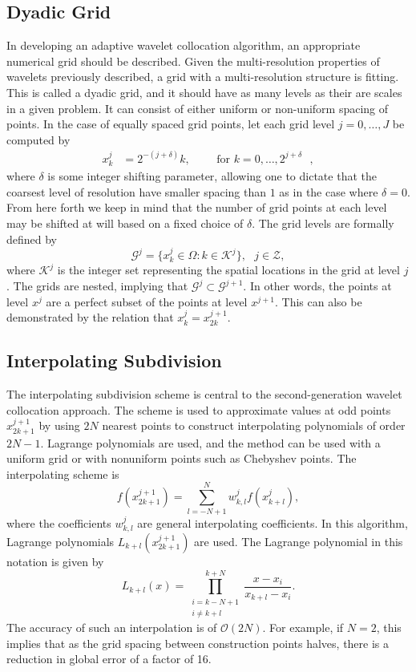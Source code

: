 \documentclass[11pt]{article}
\begin{document}
\subsection{Dyadic Grid}
In developing an adaptive wavelet collocation algorithm, an appropriate numerical grid should be described. Given the 
multi-resolution properties of wavelets previously described, a grid with a multi-resolution structure is fitting. This 
is called a dyadic grid, and it should have as many levels as their are scales in a given problem. It can consist of 
either uniform or non-uniform
spacing of points. In the case of equally spaced grid points, let each grid level $j = 0, \dots, J$ be computed by 
\begin{align}
x^{j}_{k} &= 2^{-(j+\delta)} k,\text{ } \text{ } \text{ }  \text{ for $k=0,\dots,2^{j+\delta}$ },
\end{align}
where $\delta$ is some integer shifting parameter, allowing one to dictate that the coarsest level of resolution have 
smaller spacing than $1$ as in the case where $\delta=0$. From here forth we keep in mind that the 
number of grid points at each level may be shifted at will based on a fixed choice of $\delta$. 
The grid levels are formally defined by 
\begin{equation}
    \mathcal{G}^j= \{ x_{k}^{j} \in \Omega : k \in \mathcal{K}^j \}, \text{ } j \in \mathcal{Z},
\end{equation}
where $\mathcal{K}^{j}$ is the integer set representing the spatial locations in the grid at level $j$. The grids are 
nested, implying that $\mathcal{G}^{j} \subset \mathcal{G}^{j+1}$. In other words, the points at level $x^{j}$ are a perfect 
subset of the points at level $x^{j+1}$. This can also be demonstrated by the relation that 
$x_{k}^{j}=x_{2k}^{j+1}$.

\subsection{Interpolating Subdivision}
The interpolating subdivision scheme is central to the second-generation wavelet collocation approach. The scheme is used to
approximate values at odd points $x_{2k+1}^{j+1}$ by using $2N$ nearest points to construct interpolating polynomials of 
order $2N-1$. Lagrange polynomials are used, and the method can be used with a uniform grid or with 
nonuniform points such as Chebyshev points. The interpolating scheme is 
\begin{equation}
    f(x_{2k+1}^{j+1})=\sum_{l=-N+1}^{N} w_{k,l}^{j} f(x_{k+l}^{j}), \label{interp}
\end{equation}
where the coefficients $w_{k,l}^{j}$ are general interpolating coefficients. In this algorithm, Lagrange 
polynomials $L_{k+l}(x_{2k+1}^{j+1})$ are used. The 
Lagrange polynomial in this notation is given by 
\begin{equation}
    L_{k+l}(x)=\prod_{ \substack{ i=k-N+1 \\ i\neq k+l } }^{k+N} \frac{x-x_i}{x_{k+l}-x_i}.
\end{equation}
The accuracy of such an interpolation is of $\mathcal{O}(2N)$.  For example, if $N=2$, this implies that 
as the grid spacing between construction points halves, there is a reduction in global error of a factor of 16. 
\end{document}
